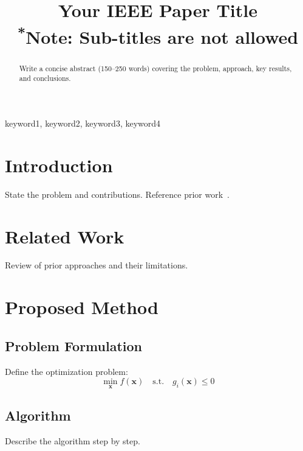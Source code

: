\documentclass[conference]{IEEEtran}
\begin{document}
\title{Your IEEE Paper Title\\
{\footnotesize \textsuperscript{*}Note: Sub-titles are not allowed}
}

\author{
\and
{}
}

\maketitle

\begin{abstract}
Write a concise abstract (150--250 words) covering the problem, approach, key results, and conclusions.
\end{abstract}

\begin{IEEEkeywords}
keyword1, keyword2, keyword3, keyword4
\end{IEEEkeywords}

\section{Introduction}
\label{sec:intro}
State the problem and contributions. Reference prior work~\cite{ref1}.

\section{Related Work}
\label{sec:related}
Review of prior approaches and their limitations.

\section{Proposed Method}
\label{sec:method}

\subsection{Problem Formulation}
Define the optimization problem:
\begin{equation}
    \min_{\mathbf{x}} f(\mathbf{x}) \quad \text{s.t.} \quad g_i(\mathbf{x}) \leq 0
\end{equation}

\subsection{Algorithm}
Describe the algorithm step by step.
\end{document}
